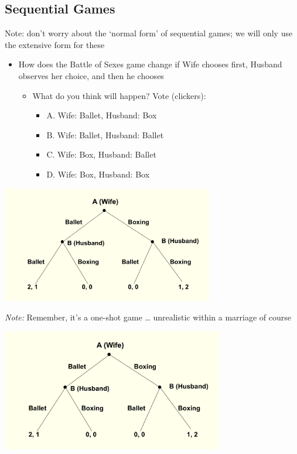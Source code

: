 \documentclass[]{article}
\providecommand{\tightlist}{%
  \setlength{\itemsep}{0pt}\setlength{\parskip}{0pt}}
\begin{document}
\hypertarget{sequential-games}{%
\subsection{Sequential Games}\label{sequential-games}}

Note: don't worry about the `normal form' of sequential games; we will
only use the extensive form for these

\begin{itemize}
\tightlist
\item
  How does the Battle of Sexes game change if Wife chooses first,
  Husband observes her choice, and then he chooses

  \begin{itemize}
  \tightlist
  \item
    What do you think will happen? Vote (clickers):

    \begin{itemize}
    \tightlist
    \item
      A. Wife: Ballet, Husband: Box
    \item
      B. Wife: Ballet, Husband: Ballet
    \item
      C. Wife: Box, Husband: Ballet
    \item
      D. Wife: Box, Husband: Box
    \end{itemize}
  \end{itemize}
\end{itemize}

\includegraphics[height=2in]{picsfigs/BOS_sequential.png}

\emph{Note:} Remember, it's a one-shot game \ldots{} unrealistic within
a marriage of course

\includegraphics[height=2.1in]{picsfigs/BOS_sequential.png}
\end{document}
